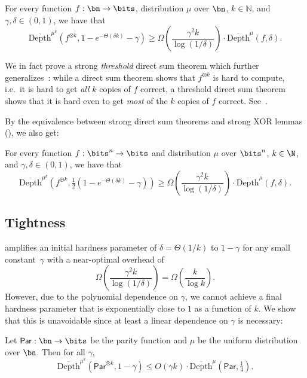 \documentclass[11pt]{article}
\begin{document}
\begin{theorem}
\label{thm:main-formal} 
For every function $f: \bn \to \bits$, distribution $\mu$  over $\bn$, $k\in \mathbb{N}$, and $\gamma, \delta \in (0,1)$, we have that 
\[ 
 \overline{\mathrm{Depth}}^{\mu^k}(f^{\otimes k},1-e^{-\Theta(\delta k)}-\gamma) \ge \Omega\left( \frac{\gamma^2 k}{\log(1/\delta)}\right) \cdot \overline{\mathrm{Depth}}^{\mu}(f,\delta).
\] 
\end{theorem} 
We in fact prove a strong {\sl threshold} direct sum theorem which further generalizes~: while a direct sum theorem shows that $f^{\otimes k}$ is hard to compute, i.e.~it is hard to get {\sl all} $k$ copies of $f$ correct, a threshold direct sum theorem shows that it is hard even to get {\sl most} of the $k$ copies of $f$ correct. See~. 

By the equivalence between strong direct sum theorems and strong XOR lemmas (), we also get: 

\begin{theorem}
\label{thm:main-xor}
For every function $f:\bits^n\to\bits$ and distribution $\mu$ over $\bits^n$, $k\in\N$, and $\gamma,\delta\in(0,1)$, we have that
    $$
    \overline{\mathrm{Depth}}^{\mu^k}\left(f^{\oplus k},\tfrac{1}{2}(1-e^{-\Theta(\delta k)}-\gamma)\right)\ge {\Omega}\left(\frac{\gamma^2 k}{\log(1/\delta)}\right)\cdot\overline{\mathrm{Depth}}^\mu(f,\delta).
    $$
\end{theorem}

\subsection{Tightness}  amplifies an initial hardness parameter of $\delta = \Theta(1/k)$ to $1-\gamma$ for any small constant~$\gamma$ with a near-optimal overhead of 
\[ \Omega\left(\frac{\gamma^2 k}{\log(1/\delta)}\right) = \Omega\left(\frac{k}{\log k}\right).\]
However, due to the polynomial dependence on $\gamma$, we cannot achieve a final hardness parameter that is exponentially close to $1$ as a function of $k$. We show that this is unavoidable since at least a linear dependence on $\gamma$ is necessary:  

\begin{claim}
\label{claim:linear dependence on gamma}
        Let $\mathsf{Par} : \bn\to\bits$ be the parity function and $\mu $ be the uniform distribution over $\bn$. Then for all $\gamma$,
    \[
\overline{\mathrm{Depth}}^{\mu^k}(\mathsf{Par}^{\otimes k}, 1 -\gamma) \leq O(\gamma k) \cdot \overline{\mathrm{Depth}}^\mu(\mathsf{Par}, \tfrac1{4}).
    \]
\end{claim}
\end{document}
